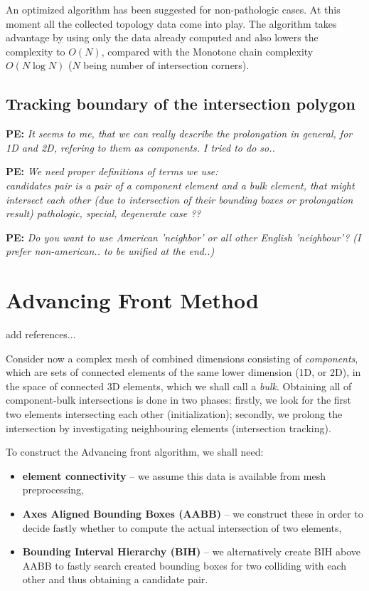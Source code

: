 \documentclass{elsarticle}
\newcommand{\notePE}[1]{{\color{Orange} \textbf{PE: } \textit{#1}}}
\begin{document}
An optimized algorithm has been suggested for non-pathologic cases. At this moment all the collected topology 
data come into play. The algorithm takes advantage by using only the data already computed and also lowers
the complexity to $O(N)$, compared with the Monotone chain complexity $O(N\log N)$ 
($N$ being number of intersection corners).


\subsection{Tracking boundary of the intersection polygon}
\label{sec:front advancing}
\notePE{It seems to me, that we can really describe the prolongation in general, for 1D and 2D, 
refering to them as components. I tried to do so..}

\notePE{We need proper definitions of terms we use: \\
\emph{candidates pair}  is a pair of a component element and a bulk element, that might intersect
each other (due to intersection of their bounding boxes or prolongation result)
\emph{pathologic, special, degenerate case ??}
}

\notePE{Do you want to use American 'neighbor' or all other English 'neighbour'? (I prefer non-american.. to be unified at the end..)}


\section{Advancing Front Method}

add references...

Consider now a complex mesh of combined dimensions consisting of \emph{components}, which are sets of connected
elements of the same lower dimension (1D, or 2D), in the space of connected 3D elements, which we shall call a \emph{bulk}. 
Obtaining all of component-bulk intersections is done in two phases: firstly, we look for the first two elements intersecting each other (initialization); secondly, we prolong the intersection by investigating neighbouring elements (intersection tracking).

To construct the Advancing front algorithm, we shall need:
\begin{itemize}
    \item \textbf{element connectivity} -- we assume this data is available from mesh preprocessing,
    \item \textbf{Axes Aligned Bounding Boxes (AABB)} -- we construct these in order to decide fastly
                    whether to compute the actual intersection of two elements,
    \item \textbf{Bounding Interval Hierarchy (BIH)} -- we alternatively create BIH above AABB to fastly search 
                    created bounding boxes for two colliding with each other and thus obtaining a candidate pair.
\end{itemize}
\end{document}
